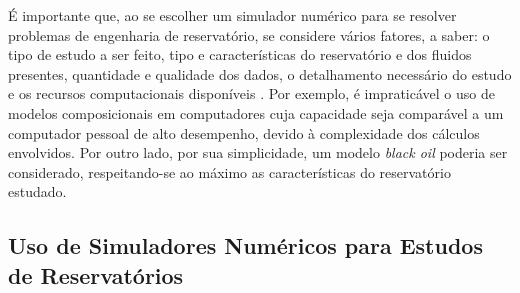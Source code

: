 
É importante que, ao se escolher um simulador numérico para se resolver problemas de engenharia de reservatório, se considere vários fatores, a saber: o tipo de estudo a ser feito, tipo e características do reservatório e dos fluidos presentes, quantidade e qualidade dos dados, o detalhamento necessário do estudo e os recursos computacionais disponíveis \cite[p. 519]{engres}. Por exemplo, é impraticável o uso de modelos composicionais em computadores cuja capacidade seja comparável a um computador pessoal de alto desempenho, devido à complexidade dos cálculos envolvidos. Por outro lado, por sua simplicidade, um modelo \textit{black oil} poderia ser considerado, respeitando-se ao máximo as características do reservatório estudado.

\subsection{Uso de Simuladores Numéricos para Estudos de Reservatórios}

